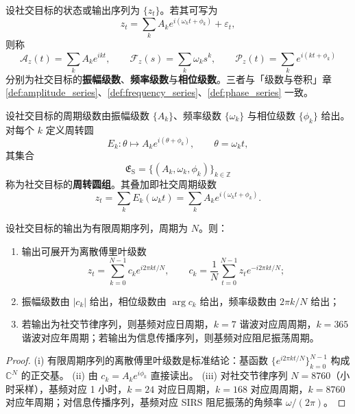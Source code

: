 \begin{definition}\label{def:social_series}
设社交目标的状态或输出序列为 $\{z_t\}$。若其可写为
\[
z_t=\sum_k A_k e^{i(\omega_k t+\phi_k)}+\varepsilon_t,
\]
则称
\[
\mathcal A_z(t)=\sum_k A_k e^{ikt},\qquad
\mathcal F_z(s)=\sum_k \omega_k s^k,\qquad
\mathcal P_z(t)=\sum_k e^{i(kt+\phi_k)}
\]
分别为社交目标的\textbf{振幅级数}、\textbf{频率级数}与\textbf{相位级数}。三者与「级数与卷积」章 \cref{def:amplitude_series}、\cref{def:frequency_series}、\cref{def:phase_series} 一致。
\end{definition}

\begin{definition}[社交周转圆组]\label{def:social_epicycle_group}
设社交目标的周期级数由振幅级数 $\{A_k\}$、频率级数 $\{\omega_k\}$ 与相位级数 $\{\phi_k\}$ 给出。对每个 $k$ 定义周转圆
\[
E_k:\theta\mapsto A_k e^{i(\theta+\phi_k)},\qquad \theta=\omega_k t,
\]
其集合
\[
\mathfrak E_{\mathrm{S}}=\{(A_k,\omega_k,\phi_k)\}_{k\in\mathbb Z}
\]
称为社交目标的\textbf{周转圆组}。其叠加即社交周期级数
\[
z_t=\sum_k E_k(\omega_k t)=\sum_k A_k e^{i(\omega_k t+\phi_k)}.
\]
\end{definition}

\begin{theorem}[由社交数据构建周期级数]\label{thm:social_series_reconstruction}
设社交目标的输出为有限周期序列，周期为 $N$。则：
\begin{enumerate}[label=(\roman*)]
    \item 输出可展开为离散傅里叶级数
    \[
    z_t=\sum_{k=0}^{N-1}c_k e^{i2\pi kt/N},\qquad
    c_k=\frac1N\sum_{t=0}^{N-1}z_t e^{-i2\pi kt/N};
    \]
    \item 振幅级数由 $|c_k|$ 给出，相位级数由 $\arg c_k$ 给出，频率级数由 $2\pi k/N$ 给出；
    \item 若输出为社交节律序列，则基频对应日周期，$k=7$ 谐波对应周周期，$k=365$ 谐波对应年周期；若输出为信息传播序列，则基频对应阻尼振荡周期。
\end{enumerate}
\end{theorem}

\begin{proof}
(i) 有限周期序列的离散傅里叶级数是标准结论：基函数 $\{e^{i2\pi kt/N}\}_{k=0}^{N-1}$ 构成 $\mathbb C^N$ 的正交基。
(ii) 由 $c_k=A_k e^{i\phi_k}$ 直接读出。
(iii) 对社交节律序列 $N=8760$（小时采样），基频对应 1 小时，$k=24$ 对应日周期，$k=168$ 对应周周期，$k=8760$ 对应年周期；对信息传播序列，基频对应 SIRS 阻尼振荡的角频率 $\omega/(2\pi)$。
\end{proof}

